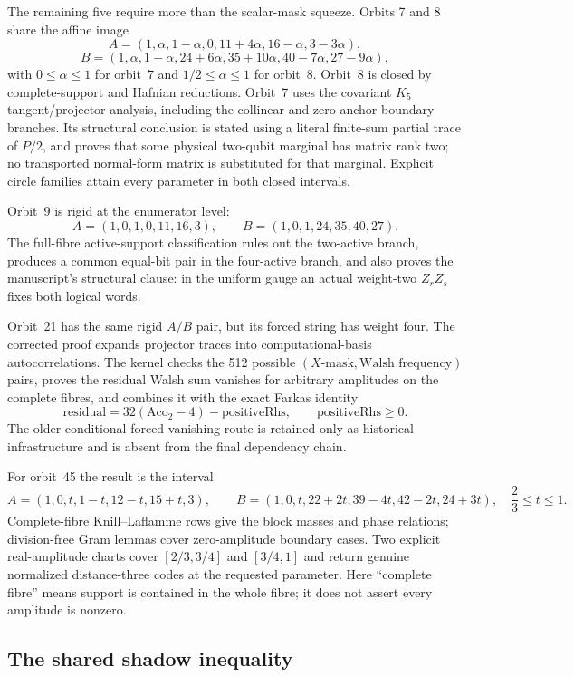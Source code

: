 \documentclass[11pt,a4paper]{article}
\theoremstyle{definition}
\begin{document}
The remaining five require more than the scalar-mask squeeze. Orbits 7 and 8
share the affine image
\[
 A=(1,\alpha,1-\alpha,0,11+4\alpha,16-\alpha,3-3\alpha),
\]
\[
 B=(1,\alpha,1-\alpha,24+6\alpha,35+10\alpha,40-7\alpha,27-9\alpha),
\]
with $0\le\alpha\le1$ for orbit~7 and $1/2\le\alpha\le1$ for orbit~8.
Orbit~8 is closed by complete-support and Hafnian reductions. Orbit~7 uses the
covariant $K_5$ tangent/projector analysis, including the collinear and
zero-anchor boundary branches. Its structural conclusion is stated using a
literal finite-sum partial trace of $P/2$, and proves that some physical
two-qubit marginal has matrix rank two; no transported normal-form matrix is
substituted for that marginal. Explicit circle families attain every parameter
in both closed intervals.

Orbit~9 is rigid at the enumerator level:
\[
 A=(1,0,1,0,11,16,3),\qquad B=(1,0,1,24,35,40,27).
\]
The full-fibre active-support classification rules out the two-active branch,
produces a common equal-bit pair in the four-active branch, and also proves the
manuscript's structural clause: in the uniform gauge an actual weight-two
$Z_rZ_s$ fixes both logical words.

Orbit~21 has the same rigid $A/B$ pair, but its forced string has weight four.
The corrected proof expands projector traces into computational-basis
autocorrelations. The kernel checks the 512 possible
$(X\text{-mask},\text{Walsh frequency})$ pairs, proves the residual Walsh sum
vanishes for arbitrary amplitudes on the complete fibres, and combines it with
the exact Farkas identity
\[
 \mathrm{residual}=32(\mathrm{Aco}_2-4)-\mathrm{positiveRhs},
 \qquad \mathrm{positiveRhs}\ge0.
\]
The older conditional forced-vanishing route is retained only as historical
infrastructure and is absent from the final dependency chain.

For orbit~45 the result is the interval
\[
 A=(1,0,t,1-t,12-t,15+t,3),
 \qquad
 B=(1,0,t,22+2t,39-4t,42-2t,24+3t),
 \quad \frac23\le t\le1.
\]
Complete-fibre Knill--Laflamme rows give the block masses and phase relations;
division-free Gram lemmas cover zero-amplitude boundary cases. Two explicit
real-amplitude charts cover $[2/3,3/4]$ and $[3/4,1]$ and return genuine
normalized distance-three codes at the requested parameter. Here ``complete
fibre'' means support is contained in the whole fibre; it does not assert every
amplitude is nonzero.

\subsection{The shared shadow inequality}
\end{document}
